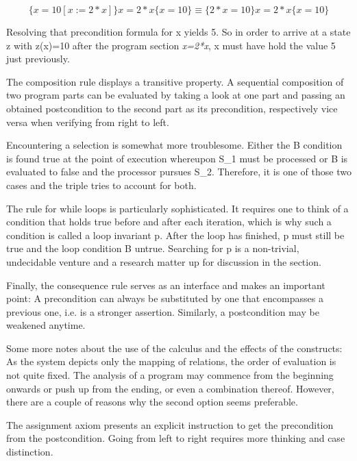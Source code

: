 \newenvironment{hoare}[0]{\begin{equation}}{\end{equation}}

\begin{hoare}
	\{x=10[x:=2*x]\} x=2*x \{x=10\} \equiv \{2*x=10\} x=2*x \{x=10\}
\end{hoare}

Resolving that precondition formula for x yields 5. So in order to arrive at a state z with z(x)=10 after the program section \textit{x=2*x}, x must have hold the value 5 just previously.

The composition rule displays a transitive property. A sequential composition of two program parts can be evaluated by taking a look at one part and passing an obtained postcondition to the second part as its precondition, respectively vice versa when verifying from right to left.

Encountering a selection is somewhat more troublesome. Either the B condition is found true at the point of execution whereupon S\_1 must be processed or B is evaluated to false and the processor pursues S\_2. Therefore, it is one of those two cases and the triple tries to account for both.

The rule for while loops is particularly sophisticated. It requires one to think of a condition that holds true before and after each iteration, which is why such a condition is called a loop invariant p. After the loop has finished, p must still be true and the loop condition B untrue. Searching for p is a non-trivial, undecidable venture and a research matter up for discussion in the  section.

Finally, the consequence rule serves as an interface and makes an important point: A precondition can always be substituted by one that encompasses a previous one, i.e. is a stronger assertion. Similarly, a postcondition may be weakened anytime.

Some more notes about the use of the calculus and the effects of the constructs:
As the system depicts only the mapping of relations, the order of evaluation is not quite fixed. The analysis of a program may commence from the beginning onwards or push up from the ending, or even a combination thereof. However, there are a couple of reasons why the second option seems preferable.

The assignment axiom presents an explicit instruction to get the precondition from the postcondition. Going from left to right requires more thinking and case distinction.

